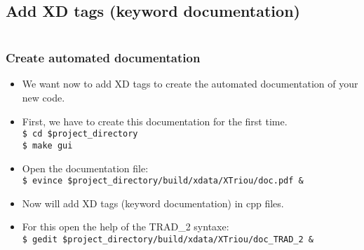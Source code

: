 \documentclass[10pt, hyperref={unicode=true,pdfusetitle, bookmarks=true,bookmarksnumbered=false,bookmarksopen=false, breaklinks=false,pdfborder={0 0 1},backref=true,colorlinks=true,linkcolor=darkblue,pageanchor, urlcolor=darkblue}]{beamer}
\begin{document}
\subsection{{\bf{Add XD tags (keyword documentation)}}}
\begin{frame}
\begin{columns}[c] 
\tableofcontents[sections={1-4},currentsection, currentsubsection]
\tableofcontents[sections={5-10},currentsection, currentsubsection]
\end{columns}
\end{frame}
\begin{frame}
\frametitle{Create automated documentation}
\begin{block}{}

\begin{itemize}
\item We want now to add XD tags to create the automated documentation of your new code.
\item First, we have to create this documentation for the first time.\\
\texttt{\$ cd \$project\_directory}\\
\texttt{\$ make gui}
\item Open the documentation file:\\
\texttt{\$ evince \$project\_directory/build/xdata/XTriou/doc.pdf \&}
\item Now will add XD tags (keyword documentation) in cpp files.
\item For this open the help of the TRAD\_2 syntaxe:\\
\texttt{\$ gedit \$project\_directory/build/xdata/XTriou/doc\_TRAD\_2 \&}
\end{itemize}

\end{block}
\end{frame}
\end{document}
